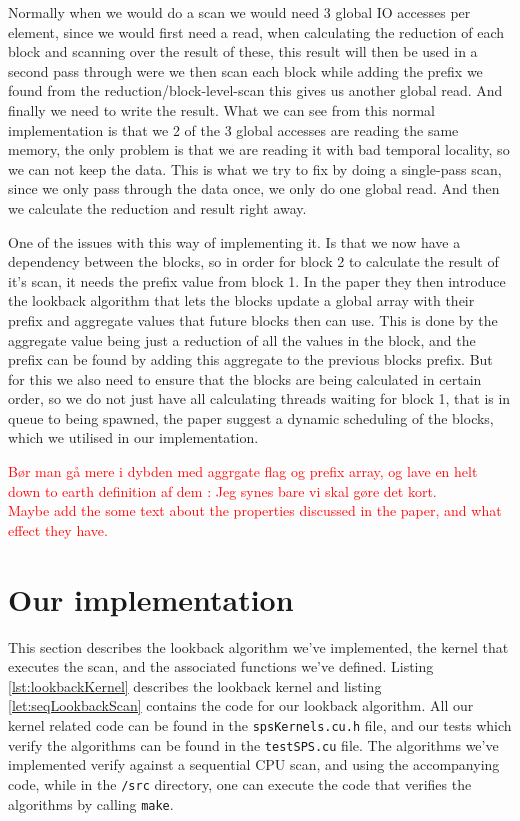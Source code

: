 \documentclass[twocolumn]{article}
\newcommand{\note}[1]{\textcolor{red}{#1}\\}
\begin{document}
Normally when we would do a scan we would need 3 global IO accesses per element, since we would first need a read, when calculating the reduction of each block and scanning over the result of these, this result will then be used in a second pass through were we then scan each block while adding the prefix we found from the reduction/block-level-scan this gives us another global read. And finally we need to write the result. What we can see from this normal implementation is that we 2 of the 3 global accesses are reading the same memory, the only problem is that we are reading it with bad temporal locality, so we can not keep the data. This is what we try to fix by doing a single-pass scan, since we only pass through the data once, we only do one global read. And then we calculate the reduction and result right away.

One of the issues with this way of implementing it. Is that we now have a dependency between the blocks, so in order for block 2 to calculate the result of it's scan, it needs the prefix value from block 1. In the paper they then introduce the lookback algorithm that lets the blocks update a global array with their prefix and aggregate values that future blocks then can use. This is done by the aggregate value being just a reduction of all the values in the block, and the prefix can be found by adding this aggregate to the previous blocks prefix. But for this we also need to ensure that the blocks are being calculated in certain order, so we do not just have all calculating threads waiting for block 1, that is in queue to being spawned, the paper suggest a dynamic scheduling of the blocks, which we utilised in our implementation.

\note{Bør man gå mere i dybden med aggrgate flag og prefix array, og lave en helt down to earth definition af dem : Jeg synes bare vi skal gøre det kort.}

\note{Maybe add the some text about the properties discussed in the paper, and what effect they have.}

\section{Our implementation}
\label{Sec:Implementation}
This section describes the lookback algorithm we've implemented, the kernel that executes the scan, and the associated functions we've defined. Listing \ref{lst:lookbackKernel} describes the lookback kernel and listing \ref{let:seqLookbackScan} contains the code for our lookback algorithm. All our kernel related code can be found in the \verb|spsKernels.cu.h| file, and our tests which verify the algorithms can be found in the \verb|testSPS.cu| file. The algorithms we've implemented verify against a sequential CPU scan, and using the accompanying code, while in the \verb|/src| directory, one can execute the code that verifies the algorithms by calling \verb|make|.
\end{document}
